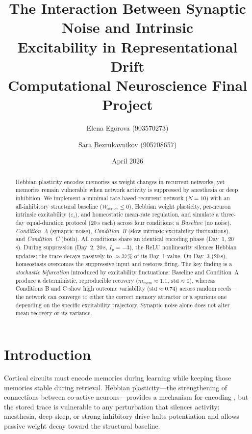 \documentclass[11pt,a4paper]{article}
\title{\textbf{The Interaction Between Synaptic Noise and Intrinsic\\
Excitability in Representational Drift}\\[0.5em]
\large Computational Neuroscience \textemdash{} Final Project}
\author{Elena Egorova (903570273) \and Sara Bezrukavnikov (905708657)}
\date{April 2026}
\begin{document}
\maketitle
\thispagestyle{empty}

\begin{abstract}
Hebbian plasticity encodes memories as weight changes in recurrent networks, yet
memories remain vulnerable when network activity is suppressed by anesthesia or
deep inhibition.  We implement a minimal rate-based recurrent network ($N=10$)
with an all-inhibitory structural baseline ($W_\mathrm{struct}\leq 0$), Hebbian
weight plasticity, per-neuron intrinsic excitability ($\varepsilon_i$), and
homeostatic mean-rate regulation, and simulate a three-day equal-duration protocol
(20\,s each) across four conditions: a \emph{Baseline} (no noise),
\emph{Condition~A} (synaptic noise), \emph{Condition~B} (slow intrinsic
excitability fluctuations), and \emph{Condition~C} (both).
All conditions share an identical encoding phase (Day~1, 20\,s).
During suppression (Day~2, 20\,s, $I_p=-3$), the ReLU nonlinearity silences
Hebbian updates; the trace decays passively to $\approx37\%$ of its Day~1 value.
On Day~3 (20\,s), homeostasis overcomes the suppressive input and restores firing.
The key finding is a \emph{stochastic bifurcation} introduced by excitability
fluctuations: Baseline and Condition~A produce a deterministic, reproducible
recovery ($m_\mathrm{mem}\approx1.1$, $\mathrm{std}\approx0$), whereas Conditions
B and C show high outcome variability ($\mathrm{std}\approx0.74$) across random
seeds---the network can converge to either the correct memory attractor or a
spurious one depending on the specific excitability trajectory.
Synaptic noise alone does not alter mean recovery or its variance.
\end{abstract}

\section{Introduction}

Cortical circuits must encode memories during learning while keeping those
memories stable during retrieval.  Hebbian plasticity---the strengthening of
connections between co-active neurons---provides a mechanism for encoding
\citep{Rule2019}, but the stored trace is vulnerable to any perturbation that
silences activity: anesthesia, deep sleep, or strong inhibitory drive halts
potentiation and allows passive weight decay toward the structural baseline.
\end{document}
